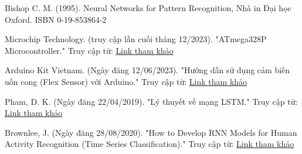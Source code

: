 \newpage
{}
\renewcommand\refname{Tài liệu tham khảo}
\begin{thebibliography}{3}
    \item Bishop C. M. (1995). Neural Networks for Pattern Recognition, Nhà in Đại học Oxford. ISBN 0-19-853864-2
    \item Microchip Technology. (truy cập lần cuối tháng 12/2023). "ATmega328P Microcontroller." Truy cập từ: \href{https://www.microchip.com/en-us/product/ATmega328P}{Link tham khảo} 
    \item Arduino Kit Vietnam. (Ngày đăng 12/06/2023). "Hướng dẫn sử dụng cảm biến uốn cong (Flex Sensor) với Arduino." Truy cập từ: \href{https://arduinokit.vn/huong-dan-su-dung-cam-bien-uon-cong-flex-sensor-voi-arduino/}{Link tham khảo} 
    \item Pham, D. K. (Ngày đăng 22/04/2019). "Lý thuyết về mạng LSTM." Truy cập từ: \href{https://phamdinhkhanh.github.io/2019/04/22/Ly_thuyet_ve_mang_LSTM.html?fbclid=IwAR0rBn2SL1vPNYmLgixLra-BoMMb6f98mhPrMxv_BhX13_9sK3_4da1vN6c}{Link tham khảo}
    \item Brownlee, J. (Ngày đăng 28/08/2020). "How to Develop RNN Models for Human Activity Recognition (Time Series Classification)." Truy cập từ: \href{https://machinelearningmastery.com/how-to-develop-rnn-models-for-human-activity-recognition-time-series-classification/}{Link tham khảo}  
    
\end{thebibliography}